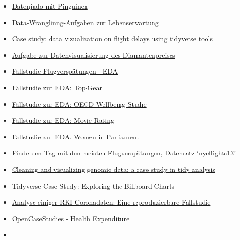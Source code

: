 \documentclass[
  letterpaper,
  DIV=11,
  numbers=noendperiod]{scrreprt}
\theoremstyle{definition}
\theoremstyle{definition}
\theoremstyle{remark}
\begin{document}
\begin{itemize}
\item
  \href{https://allisonhorst.shinyapps.io/dplyr-learnr/\#section-welcome}{Datenjudo
  mit Pinguinen}
\item
  \href{https://data-se.netlify.app/2021/02/24/exercises-to-data-wrangling-with-the-tidyverse/}{Data-Wranglinng-Aufgaben
  zur Lebenserwartung}
\item
  \href{https://data-se.netlify.app/2021/02/24/case-study-data-vizualization-on-flight-delays-using-tidyverse-tools/}{Case
  study: data vizualization on flight delays using tidyverse tools}
\item
  \href{https://data-se.netlify.app/2020/12/07/ex-visualizing-diamonds/}{Aufgabe
  zur Datenvisualisierung des Diamantenpreises}
\item
  \href{https://data-se.netlify.app/2021/03/08/eda-zu-flugversp\%C3\%A4tungen/}{Fallstudie
  Flugverspätungen - EDA}
\item
  \href{https://data-se.netlify.app/2021/02/11/yacda-topgear/}{Fallstudie
  zur EDA: Top-Gear}
\item
  \href{https://data-se.netlify.app/2021/02/11/explorative-datenanalyse-zum-datensatz-oecd-wellbeing/}{Fallstudie
  zur EDA: OECD-Wellbeing-Studie}
\item
  \href{https://minimaxir.com/2018/07/imdb-data-analysis/}{Fallstudie
  zur EDA: Movie Rating}
\item
  \href{https://github.com/saghirb/WiP-tidyverse/blob/master/doc/WiP-tidyverse.pdf}{Fallstudie
  zur EDA: Women in Parliament}
\item
  \href{https://data-se.netlify.app/2021/05/27/datensatz-flights-finde-den-tag-mit-den-meisten-abfl\%C3\%BCgen/}{Finde
  den Tag mit den meisten Flugverspätungen, Datensatz `nycflights13'}
\item
  \href{http://varianceexplained.org/r/tidy-genomics/}{Cleaning and
  visualizing genomic data: a case study in tidy analysis}
\item
  \href{https://www.njtierney.com/post/2017/11/07/tidyverse-billboard/}{Tidyverse
  Case Study: Exploring the Billboard Charts}
\item
  \href{https://data-se.netlify.app/2021/11/27/analyse-der-rki-coronadaten/}{Analyse
  einiger RKI-Coronadaten: Eine reproduzierbare Fallstudie}
\item
  \href{https://www.opencasestudies.org/casestudies/ocs-healthexpenditure.html}{OpenCaseStudies
  - Health Expenditure}
\item

\end{itemize}
\end{document}
